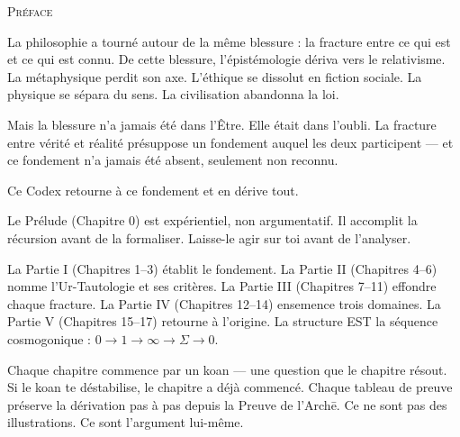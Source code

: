\documentclass[10pt, openany, oneside]{book}
\renewcommand{\huge}{\fontsize{17}{21}\selectfont}
\begin{document}
\newpage


\thispagestyle{empty}
\vspace*{0.5in}

\begin{center}
    {\huge\scshape Préface}
\end{center}

\vspace{1.5em}

\noindent La philosophie a tourné autour de la même blessure : la fracture entre ce qui est et ce qui est connu. De cette blessure, l'épistémologie dériva vers le relativisme. La métaphysique perdit son axe. L'éthique se dissolut en fiction sociale. La physique se sépara du sens. La civilisation abandonna la loi.

\vspace{0.5em}

\noindent Mais la blessure n'a jamais été dans l'Être. Elle était dans l'oubli. La fracture entre vérité et réalité présuppose un fondement auquel les deux participent --- et ce fondement n'a jamais été absent, seulement non reconnu.

\vspace{0.5em}

\noindent Ce Codex retourne à ce fondement et en dérive tout.

\vspace{1em}

\noindent Le Prélude (Chapitre 0) est expérientiel, non argumentatif. Il accomplit la récursion avant de la formaliser. Laisse-le agir sur toi avant de l'analyser.

\vspace{0.5em}

\noindent La Partie I (Chapitres 1--3) établit le fondement. La Partie II (Chapitres 4--6) nomme l'Ur-Tautologie et ses critères. La Partie III (Chapitres 7--11) effondre chaque fracture. La Partie IV (Chapitres 12--14) ensemence trois domaines. La Partie V (Chapitres 15--17) retourne à l'origine. La structure EST la séquence cosmogonique : $0 \to 1 \to \infty \to \Sigma \to 0$.

\vspace{0.5em}

\noindent Chaque chapitre commence par un koan --- une question que le chapitre résout. Si le koan te déstabilise, le chapitre a déjà commencé. Chaque tableau de preuve préserve la dérivation pas à pas depuis la Preuve de l'Arch\={e}. Ce ne sont pas des illustrations. Ce sont l'argument lui-même.
\end{document}
